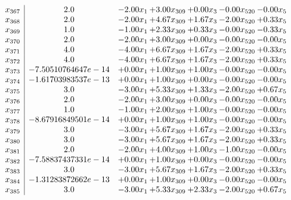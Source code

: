 \documentclass[8pt]{article}
\begin{document}
\[\begin{array}{c| c c@{\hskip 2pt} c@{\hskip 2pt} c@{\hskip 2pt} c@{\hskip 2pt} c@{\hskip 2pt} }
 x_{367}   &  2.0 & -2.00 x_{1} & +  3.00 x_{309} & +  0.00 x_{3} & -0.00 x_{520} & -0.00 x_{5}\\
 x_{368}   &  2.0 & -2.00 x_{1} & +  4.67 x_{309} & +  1.67 x_{3} & -2.00 x_{520} & +  0.33 x_{5}\\
 x_{369}   &  1.0 & -1.00 x_{1} & +  2.33 x_{309} & +  0.33 x_{3} & -0.00 x_{520} & -0.33 x_{5}\\
 x_{370}   &  2.0 & -2.00 x_{1} & +  3.00 x_{309} & +  0.00 x_{3} & -0.00 x_{520} & -0.00 x_{5}\\
 x_{371}   &  4.0 & -4.00 x_{1} & +  6.67 x_{309} & +  1.67 x_{3} & -2.00 x_{520} & +  0.33 x_{5}\\
 x_{372}   &  4.0 & -4.00 x_{1} & +  6.67 x_{309} & +  1.67 x_{3} & -2.00 x_{520} & +  0.33 x_{5}\\
 x_{373}   &  -7.50510764647e-14 & +  0.00 x_{1} & +  1.00 x_{309} & +  1.00 x_{3} & -0.00 x_{520} & -0.00 x_{5}\\
 x_{374}   &  -1.61703983537e-13 & +  0.00 x_{1} & +  1.00 x_{309} & +  0.00 x_{3} & -0.00 x_{520} & -0.00 x_{5}\\
 x_{375}   &  3.0 & -3.00 x_{1} & +  5.33 x_{309} & +  1.33 x_{3} & -2.00 x_{520} & +  0.67 x_{5}\\
 x_{376}   &  2.0 & -2.00 x_{1} & +  3.00 x_{309} & +  0.00 x_{3} & -0.00 x_{520} & -0.00 x_{5}\\
 x_{377}   &  1.0 & -1.00 x_{1} & +  2.00 x_{309} & +  1.00 x_{3} & -0.00 x_{520} & -0.00 x_{5}\\
 x_{378}   &  -8.67916849501e-14 & +  0.00 x_{1} & +  1.00 x_{309} & +  1.00 x_{3} & -0.00 x_{520} & -0.00 x_{5}\\
 x_{379}   &  3.0 & -3.00 x_{1} & +  5.67 x_{309} & +  1.67 x_{3} & -2.00 x_{520} & +  0.33 x_{5}\\
 x_{380}   &  3.0 & -3.00 x_{1} & +  5.67 x_{309} & +  1.67 x_{3} & -2.00 x_{520} & +  0.33 x_{5}\\
 x_{381}   &  2.0 & -2.00 x_{1} & +  4.00 x_{309} & +  1.00 x_{3} & -1.00 x_{520} & -0.00 x_{5}\\
 x_{382}   &  -7.58837437331e-14 & +  0.00 x_{1} & +  1.00 x_{309} & +  0.00 x_{3} & -0.00 x_{520} & -0.00 x_{5}\\
 x_{383}   &  3.0 & -3.00 x_{1} & +  5.67 x_{309} & +  1.67 x_{3} & -2.00 x_{520} & +  0.33 x_{5}\\
 x_{384}   &  -1.31283872662e-13 & +  0.00 x_{1} & +  1.00 x_{309} & +  0.00 x_{3} & -0.00 x_{520} & -0.00 x_{5}\\
 x_{385}   &  3.0 & -3.00 x_{1} & +  5.33 x_{309} & +  2.33 x_{3} & -2.00 x_{520} & +  0.67 x_{5}\\

\end{array}\]
\end{document}
